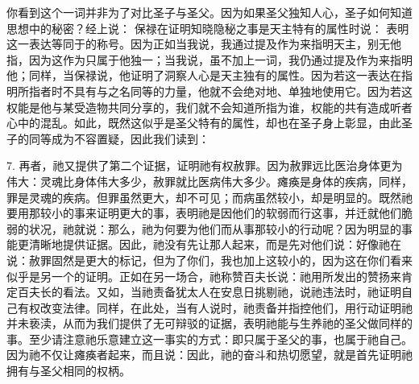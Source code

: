 你看到这个一词并非为了对比圣子与圣父。因为如果圣父独知人心，圣子如何知道思想中的秘密？经上说： 保禄在证明知晓隐秘之事是天主特有的属性时说： 表明这一表达等同于的称号。因为正如当我说，我通过提及作为来指明天主，别无他指，因为这作为只属于他独一；当我说，虽不加上一词，我仍通过提及作为来指明他；同样，当保禄说，他证明了洞察人心是天主独有的属性。因为若这一表达在指明所指者时不具有与之名同等的力量，他就不会绝对地、单独地使用它。因为若这权能是他与某受造物共同分享的，我们就不会知道所指为谁，权能的共有造成听者心中的混乱。如此，既然这似乎是圣父特有的属性，却也在圣子身上彰显，由此圣子的同等成为不容置疑，因此我们读到：\par

7. 再者，祂又提供了第二个证据，证明祂有权赦罪。因为赦罪远比医治身体更为伟大：灵魂比身体伟大多少，赦罪就比医病伟大多少。瘫痪是身体的疾病，同样，罪是灵魂的疾病。但罪虽然更大，却不可见；而病虽然较小，却是明显的。既然祂要用那较小的事来证明更大的事，表明祂是因他们的软弱而行这事，并迁就他们脆弱的状况，祂就说：那么，祂为何要为他们而从事那较小的行动呢？因为明显的事能更清晰地提供证据。因此，祂没有先让那人起来，而是先对他们说：好像祂在说：赦罪固然是更大的标记，但为了你们，我也加上这较小的，因为这在你们看来似乎是另一个的证明。正如在另一场合，祂称赞百夫长说：祂用所发出的赞扬来肯定百夫长的看法。又如，当祂责备犹太人在安息日挑剔祂，说祂违法时，祂证明自己有权改变法律。同样，在此处，当有人说时，祂责备并指控他们，用行动证明祂并未亵渎，从而为我们提供了无可辩驳的证据，表明祂能与生养祂的圣父做同样的事。至少请注意祂乐意建立这一事实的方式：即只属于圣父的事，也属于祂自己。因为祂不仅让瘫痪者起来，而且说：因此，祂的奋斗和热切愿望，就是首先证明祂拥有与圣父相同的权柄。\par

